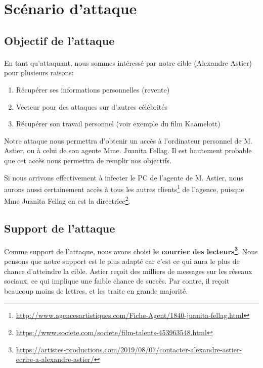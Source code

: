 \section{Scénario d'attaque}

\subsection{Objectif de l'attaque}
\paragraph{} En tant qu'attaquant, nous sommes intéressé par notre cible (Alexandre Astier) pour plusieurs raisons:
\begin{enumerate}
    \item Récupérer ses informations personnelles (revente)
    \item Vecteur pour des attaques sur d'autres célébrités
    \item Récupérer son travail personnel (voir exemple du film Kaamelott)
\end{enumerate}

Notre attaque nous permettra d'obtenir un accès à l'ordinateur personnel de M. Astier, ou à celui de son agente Mme. Juanita Fellag.
Il est hautement probable que cet accès nous permettra de remplir nos objectifs.

Si nous arrivons effectivement à infecter le PC de l'agente de M. Astier, 
nous aurons aussi certainement accès à tous les autres clients\footnote{\url{http://www.agencesartistiques.com/Fiche-Agent/1840-juanita-fellag.html}} de l'agence, puisque Mme Juanita Fellag en est la directrice\footnote{\url{https://www.societe.com/societe/film-talents-453963548.html}}.

\subsection{Support de l'attaque}

Comme support de l'attaque, nous avons choisi \textbf{le courrier des lecteurs\footnote{\url{https://artistes-productions.com/2019/08/07/contacter-alexandre-astier-ecrire-a-alexandre-astier/}}}.
Nous pensons que notre support est le plus adapté car c'est ce qui aura le plus de chance d'atteindre la cible.
Astier reçoit des milliers de messages sur les réseaux sociaux, ce qui implique une faible chance de succès.
Par contre, il reçoit beaucoup moins de lettres, et les traite en grande majorité.

